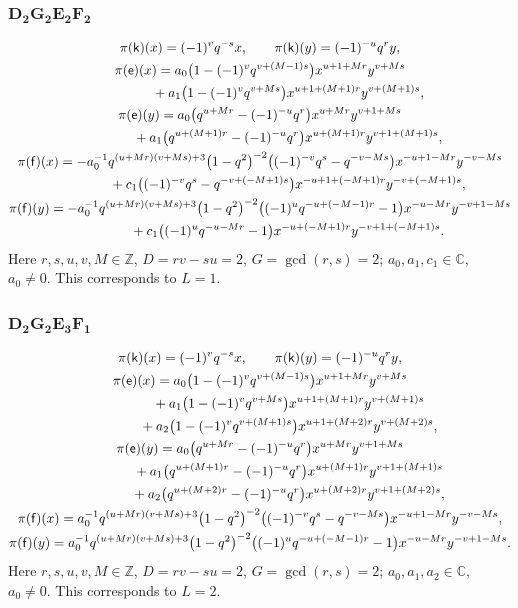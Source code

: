 \documentclass[pdftex]{sigma}
\numberwithin{equation}{section}
\begin{document}
\subsubsection*{$\boldsymbol{D_2G_2E_2F_2}$}
\begin{gather*}
\pi(\mathsf{k})(x)= (-1)^vq^{-s}x ,\qquad\pi(\mathsf{k})(y)=(-1)^{-u}q^ry ,\\
\pi(\mathsf{e})(x)= a_0\big(1-(-1)^vq^{v+(M-1)s}\big)x^{u+1+Mr}y^{v+Ms}\\
\hphantom{\pi(\mathsf{e})(x)=}{}+ a_1\big(1-(-1)^vq^{v+Ms}\big)x^{u+1+(M+1)r}y^{v+(M+1)s} ,\\
\pi(\mathsf{e})(y)= a_0\big(q^{u+Mr}-(-1)^{-u}q^r\big)x^{u+Mr}y^{v+1+Ms}\\
\hphantom{\pi(\mathsf{e})(y)=}{} + a_1\big(q^{u+(M+1)r}-(-1)^{-u}q^r\big)x^{u+(M+1)r}y^{v+1+(M+1)s} ,\\
\pi(\mathsf{f})(x)= -a_0^{-1}q^{(u+Mr)(v+Ms)+3}\big(1-q^2\big)^{-2}\big((-1)^{-v}q^s-q^{-v-Ms}\big)x^{-u+1-Mr}y^{-v-Ms}\\
\hphantom{\pi(\mathsf{f})(x)=}{} + c_1\big((-1)^{-v}q^s-q^{-v+(-M+1)s}\big)x^{-u+1+(-M+1)r}y^{-v+(-M+1)s} ,\\
\pi(\mathsf{f})(y)= -a_0^{-1}q^{(u+Mr)(v+Ms)+3}\big(1-q^2\big)^{-2}\big((-1)^uq^{-u+(-M-1)r}-1\big) x^{-u-Mr}y^{-v+1-Ms}\\
\hphantom{\pi(\mathsf{f})(y)=}{} + c_1\big((-1)^uq^{-u-Mr}-1\big)x^{-u+(-M+1)r}y^{-v+1+(-M+1)s} .
\end{gather*}
Here $r,s,u,v,M\in\mathbb{Z}$, $D=rv-su=2$, $G=\operatorname{gcd}(r,s)=2$; $a_0,a_1,c_1\in\mathbb{C}$, $a_0\ne 0$. This corresponds to $L=1$.

\subsubsection*{$\boldsymbol{D_2G_2E_3F_1}$}
\begin{gather*}
\pi(\mathsf{k})(x)= (-1)^vq^{-s}x ,\qquad\pi(\mathsf{k})(y)=(-1)^{-u}q^ry ,\\
\pi(\mathsf{e})(x)= a_0\big(1-(-1)^vq^{v+(M-1)s}\big)x^{u+1+Mr}y^{v+Ms}\\
\hphantom{\pi(\mathsf{e})(x)=}{}+ a_1\big(1-(-1)^vq^{v+Ms}\big)x^{u+1+(M+1)r}y^{v+(M+1)s}\\
\hphantom{\pi(\mathsf{e})(x)=}{}+ a_2\big(1-(-1)^vq^{v+(M+1)s}\big)x^{u+1+(M+2)r}y^{v+(M+2)s} ,\\
\pi(\mathsf{e})(y)= a_0\big(q^{u+Mr}-(-1)^{-u}q^r\big)x^{u+Mr}y^{v+1+Ms}\\
\hphantom{\pi(\mathsf{e})(y)=}{} + a_1\big(q^{u+(M+1)r}-(-1)^{-u}q^r\big)x^{u+(M+1)r}y^{v+1+(M+1)s}\\
\hphantom{\pi(\mathsf{e})(y)=}{} + a_2\big(q^{u+(M+2)r}-(-1)^{-u}q^r\big)x^{u+(M+2)r}y^{v+1+(M+2)s} ,\\
\pi(\mathsf{f})(x)= a_0^{-1}q^{(u+Mr)(v+Ms)+3}\big(1-q^2\big)^{-2}\big((-1)^{-v}q^s-q^{-v-Ms}\big)x^{-u+1-Mr}y^{-v-Ms} ,\\
\pi(\mathsf{f})(y)= a_0^{-1}q^{(u+Mr)(v+Ms)+3}\big(1-q^2\big)^{-2}\big((-1)^uq^{-u+(-M-1)r}-1\big)x^{-u-Mr}y^{-v+1-Ms} .
\end{gather*}
Here $r,s,u,v,M\in\mathbb{Z}$, $D=rv-su=2$, $G=\operatorname{gcd}(r,s)=2$; $a_0,a_1,a_2\in\mathbb{C}$, $a_0\ne 0$. This corresponds to $L=2$.
\end{document}
